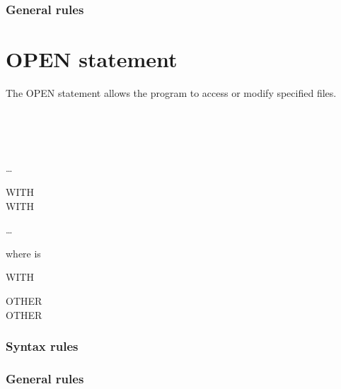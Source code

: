 \subsubsection{General rules}

\section{OPEN statement}

The OPEN statement allows the program to access or modify specified files.

\begin{syntax}
  \begin{1=}
    \begin{1=}
       \\
       \\
       \\
    \end{1=}
    \begin{0-1}
    \end{0-1}
    \begin{0-1}
    \end{0-1}
    \begin{1=}
      \filename
    \end{1=} \ldots
    \begin{0-1}
      WITH   \\
      WITH  \\
    \end{0-1}
  \end{1=}\ldots
\end{syntax}

where  is

\begin{syntax}
   WITH
  \begin{1=}
     OTHER \\
     OTHER \\
     
  \end{1=}
\end{syntax}

\subsubsection{Syntax rules}

\subsubsection{General rules}

